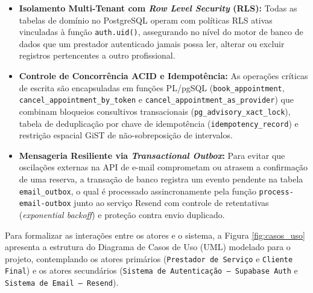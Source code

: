 \documentclass[12pt,a4paper]{article}
\begin{document}
\begin{itemize}
    \item \textbf{Isolamento Multi-Tenant com \textit{Row Level Security} (RLS):} Todas as tabelas de domínio no PostgreSQL operam com políticas RLS ativas vinculadas à função \texttt{auth.uid()}, assegurando no nível do motor de banco de dados que um prestador autenticado jamais possa ler, alterar ou excluir registros pertencentes a outro profissional.
    \item \textbf{Controle de Concorrência ACID e Idempotência:} As operações críticas de escrita são encapsuladas em funções PL/pgSQL (\texttt{book\_appointment}, \texttt{cancel\_appointment\_by\_token} e \texttt{cancel\_appointment\_as\_provider}) que combinam bloqueios consultivos transacionais (\texttt{pg\_advisory\_xact\_lock}), tabela de deduplicação por chave de idempotência (\texttt{idempotency\_record}) e restrição espacial GiST de não-sobreposição de intervalos.
    \item \textbf{Mensageria Resiliente via \textit{Transactional Outbox}:} Para evitar que oscilações externas na API de e-mail comprometam ou atrasem a confirmação de uma reserva, a transação de banco registra um evento pendente na tabela \texttt{email\_outbox}, o qual é processado assincronamente pela função \texttt{process-email-outbox} junto ao serviço Resend com controle de retentativas (\textit{exponential backoff}) e proteção contra envio duplicado.
\end{itemize}

Para formalizar as interações entre os atores e o sistema, a Figura \ref{fig:casos_uso} apresenta a estrutura do Diagrama de Casos de Uso (UML) modelado para o projeto, contemplando os atores primários (\texttt{Prestador de Serviço} e \texttt{Cliente Final}) e os atores secundários (\texttt{Sistema de Autenticação -- Supabase Auth} e \texttt{Sistema de Email -- Resend}).
\end{document}
